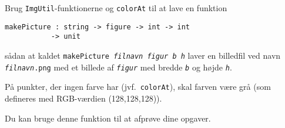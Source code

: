 Brug \texttt{ImgUtil}-funktionerne og \texttt{colorAt} til at lave en
  funktion

  \vspace{-4mm}
\begin{verbatim}
makePicture : string -> figure -> int -> int
           -> unit
\end{verbatim}
  \vspace{-4mm}

  \noindent
  sådan at kaldet \texttt{makePicture \emph{filnavn figur b h}} laver en
  billedfil ved navn \texttt{\emph{filnavn}.png} med et billede af
  \texttt{\emph{figur}} med bredde \texttt{\emph{b}} og højde
  \texttt{\emph{h}}.

  På punkter, der ingen farve har (jvf.\ \texttt{colorAt}), skal farven
  være grå (som defineres med RGB-værdien (128,128,128)).

  Du kan bruge denne funktion til at afprøve dine opgaver.
